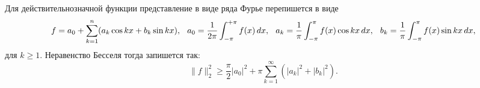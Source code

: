 \begin{to_lem}
    Для действительнозначной функции представление в виде ряда Фурье перепишется в виде
    \begin{equation*}
        f = a_0 + \sum_{k=1}^{n} (a_k \cos kx + b_k \sin kx),
        \hspace{0.25 cm}
        a_0 = \frac{1}{2\pi} \int_{-\pi}^{+\pi} f(x) \, d x,
        \hspace{2.5 mm} 
        a_k = \frac{1}{\pi}\int_{-\pi}^{\pi} f(x) \cos kx \, d x,
        \hspace{0.25 cm}
        b_k = \frac{1}{\pi} \int_{-\pi}^{\pi} f(x) \sin kx \, d x,
    \end{equation*}
    для $k \geq 1$. Неравенство Бесселя тогда запишется так:
    \begin{equation*}
        \|f\|_2^2 \geq \frac{\pi}{2} |a_0|^2 + 
        \pi \sum_{k=1}^{\infty} (|a_k|^2 + |b_k|^2).
    \end{equation*}
\end{to_lem}

